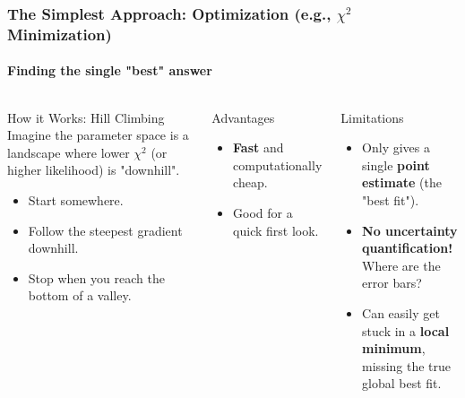 \documentclass[aspectratio=169]{beamer}
\newcommand{\keyterm}[1]{\textbf{\textcolor{C0}{#1}}}
\begin{document}
\begin{frame}
    \frametitle{The Simplest Approach: Optimization (e.g., $\chi^2$ Minimization)}
    \framesubtitle{Finding the single "best" answer}
    
    \begin{columns}[T]
        \begin{block}{How it Works: Hill Climbing}
            Imagine the parameter space is a landscape where lower $\chi^2$ (or higher likelihood) is "downhill".
            \begin{itemize}
                \item Start somewhere.
                \item Follow the steepest gradient downhill.
                \item Stop when you reach the bottom of a valley.
            \end{itemize}
        \end{block}
        
        \begin{block}{Advantages}
            \begin{itemize}
                \item \keyterm{Fast} and computationally cheap.
                \item Good for a quick first look.
            \end{itemize}
        \end{block}
        
        \begin{block}{Limitations}
            \begin{itemize}
                \item Only gives a single \keyterm{point estimate} (the "best fit").
                \item \textbf{No uncertainty quantification!} Where are the error bars?
                \item Can easily get stuck in a \keyterm{local minimum}, missing the true global best fit.
            \end{itemize}
        \end{block}
        

\end{columns}
\end{frame}
\end{document}
